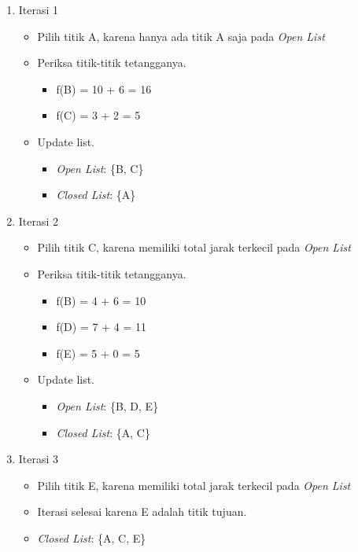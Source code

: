 \begin{enumerate}
    \item Iterasi 1
    \begin{itemize}
        \item Pilih titik A, karena hanya ada titik A saja pada \textit{Open List}
        \item Periksa titik-titik tetangganya.
        \begin{itemize}
            \item f(B) = 10 + 6 = 16
            \item f(C) = 3 + 2 = 5
        \end{itemize}
        \item Update list.
        \begin{itemize}
            \item \textit{Open List}: \{B, C\}
            \item \textit{Closed List}: \{A\}
        \end{itemize}
    \end{itemize}
\newpage
    \item Iterasi 2
    \begin{itemize}
        \item Pilih titik C, karena memiliki total jarak terkecil pada \textit{Open List}
        \item Periksa titik-titik tetangganya.
        \begin{itemize}
            \item f(B) = 4 + 6 = 10
            \item f(D) = 7 + 4 = 11
            \item f(E) = 5 + 0 = 5
        \end{itemize}
        \item Update list.
        \begin{itemize}
            \item \textit{Open List}: \{B, D, E\}
            \item \textit{Closed List}: \{A, C\}
        \end{itemize}
    \end{itemize}

    \item Iterasi 3
    \begin{itemize}
        \item Pilih titik E, karena memiliki total jarak terkecil pada \textit{Open List}
        \item Iterasi selesai karena E adalah titik tujuan.
        \item \textit{Closed List}: \{A, C, E\}
    \end{itemize}
    
\end{enumerate}